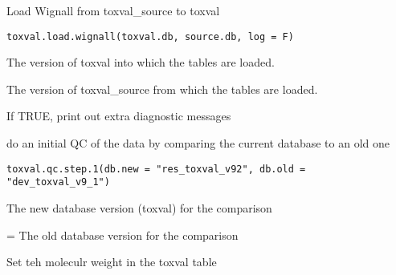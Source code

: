 \documentclass[letterpaper]{book}
\begin{document}
%
\begin{Description}\relax
Load Wignall from toxval\_source to toxval
\end{Description}
%
\begin{Usage}
\begin{verbatim}
toxval.load.wignall(toxval.db, source.db, log = F)
\end{verbatim}
\end{Usage}
%
\begin{Arguments}
\begin{ldescription}
\item[\code{toxval.db}] The version of toxval into which the tables are loaded.

\item[\code{source.db}] The version of toxval\_source from which the tables are loaded.

\item[\code{verbose}] If TRUE, print out extra diagnostic messages
\end{ldescription}
\end{Arguments}
%
\begin{Description}\relax
do an initial QC of the data by comparing the current database to an old one
\end{Description}
%
\begin{Usage}
\begin{verbatim}
toxval.qc.step.1(db.new = "res_toxval_v92", db.old = "dev_toxval_v9_1")
\end{verbatim}
\end{Usage}
%
\begin{Arguments}
\begin{ldescription}
\item[\code{db.new}] The new database version (toxval) for the comparison

\item[\code{db.old}] = The old database version for the comparison
\end{ldescription}
\end{Arguments}
%
\begin{Description}\relax
Set teh moleculr weight in the toxval table
\end{Description}
\end{document}
